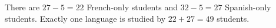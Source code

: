There are $27-5=22$ French-only students and $32-5=27$ Spanish-only students. Exactly one language is studied by $22+27=\boxed{49}$ students.

